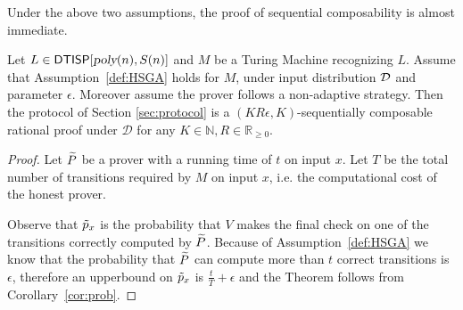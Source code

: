 \medskip
{}
Under the above two assumptions, the proof of sequential composability is almost 
immediate. 

\begin{theorem}
Let $L \in {\ensuremath{\mathsf{DTISP}}}[{\textsl{poly}}(n), S(n)]$ and $M$ be a Turing Machine recognizing $L$. Assume that  Assumption~\ref{def:HSGA} holds for $M$, under input distribution 
$\cal D$ and parameter $\epsilon$. Moreover assume the prover follows a non-adaptive strategy. Then the protocol of Section  \ref{sec:protocol} is a $(KR\epsilon, K)$-sequentially composable rational proof under $\mathcal{D}$ for any $K \in \mathbb{N}, R \in \mathbb{R}_{\geq 0}$.  
\end{theorem}
\begin{proof}
Let $\widetilde{P}$ be a prover with a running time of $t$ on input $x$.
Let $T$ be the total number of transitions required by $M$ on input $x$, i.e. the 
computational cost of the honest prover.

Observe that $\tilde{p}_x$ is the probability that $V$ makes the final check on one of the transitions correctly computed by $\widetilde{P}$. 
Because of Assumption~\ref{def:HSGA} we know that the probability that $\widetilde{P}$ can 
compute more than $t$ correct transitions is $\epsilon$, therefore an upperbound on 
$\tilde{p}_x$ is $\frac{t}{T}+\epsilon$ and the Theorem follows from Corollary~\ref{cor:prob}. 
\end{proof}
